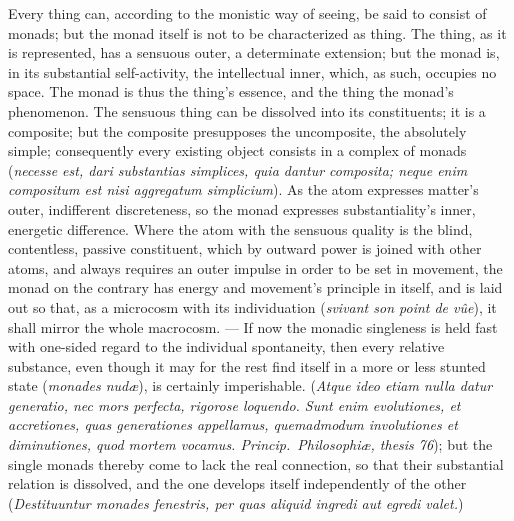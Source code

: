 \documentclass[12pt]{book}
\begin{document}
Every thing can, according to the monistic way of seeing, be said to consist
of monads; but the monad itself is not to be characterized as thing. The
thing, as it is represented, has a sensuous outer, a determinate extension;
but the monad is, in its substantial self-activity, the intellectual inner,
which, as such, occupies no space. The monad is thus the thing's essence,
and the thing the monad's phenomenon. The sensuous thing can be dissolved
into its constituents; it is a composite; but the composite presupposes the
uncomposite, the absolutely simple; consequently every existing object
consists in a complex of monads (\textit{necesse est, dari substantias
simplices, quia dantur composita; neque enim compositum est nisi aggregatum
simplicium}). As the atom expresses matter's outer, indifferent
discreteness, so the monad expresses substantiality's inner, energetic
difference. Where the atom with the sensuous quality is the blind,
contentless, passive constituent, which by outward power is joined with
other atoms, and always requires an outer impulse in order to be set in
movement, the monad on the contrary has energy and movement's principle in
itself, and is laid out so that, as a microcosm with its individuation
(\textit{svivant son point de vûe}), it shall mirror the whole macrocosm.
--- If now the monadic singleness is held fast with one-sided regard to the
individual spontaneity, then every relative substance, even though it may
for the rest find itself in a more or less stunted state (\textit{monades
nudæ}), is certainly imperishable. (\textit{Atque ideo etiam nulla datur
generatio, nec mors perfecta, rigorose loquendo. Sunt enim evolutiones, et
accretiones, quas generationes appellamus, quemadmodum involutiones et
diminutiones, quod mortem vocamus. Princip.\ Philosophiæ, thesis 76}); but
the single monads thereby come to lack the real connection, so that their
substantial relation is dissolved, and the one develops itself independently
of the other (\textit{Destituuntur monades fenestris, per quas aliquid
ingredi aut egredi valet.})
\end{document}
